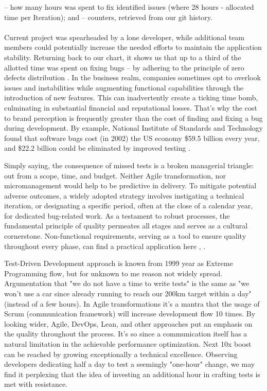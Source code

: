 \noindent {} -- how many hours was spent to fix identified issues (where 28 hours - allocated time per Iteration);
 and  -- counters, retrieved from our git history.\\
\\

Current project was spearheaded by a lone developer, while additional team members could potentially increase 
the needed efforts \cite{Alm21} to maintain the application stability. Returning back to our chart, it shows us 
that up to a third of the allotted time was spent on fixing bugs -- by adhering to the principle of zero 
defects distribution \cite{Allan98}. In the business realm, companies sometimes opt to overlook issues and instabilities 
while augmenting functional capabilities through the introduction of new features. This can inadvertently create a ticking 
time bomb, culminating in substantial financial and reputational losses. That's why the cost to brand perception is 
frequently greater than the cost of finding and fixing a bug during development. By example, National Institute of 
Standards and Technology found that software bugs cost (in 2002) the US economy \$59.5 billion every year, and 
\$22.2 billion could be eliminated by improved testing \cite{RTI02}.

Simply saying, the consequence of missed tests is a broken managerial triangle: out from a scope, time, and budget.
Neither Agile transformation, nor micromanagement would help to be predictive in delivery. To mitigate potential adverse 
outcomes, a widely adopted strategy involves instigating a technical iteration, or designating a specific period, often 
at the close of a calendar year, for dedicated bug-related work. As a testament to robust processes, the fundamental 
principle of quality permeates all stages and serves as a cultural cornerstone. Non-functional requirements, serving 
as a tool to ensure quality throughout every phase, can find a practical application here \cite{Sam17}, \cite{Suz12}. 

Test-Driven Development approach is known from 1999 year as Extreme Programming flow, but for unknown to me reason 
not widely spread. Argumentation that "we do not have a time to write tests" is the same as "we won't use a car since 
already running to reach our 200km target within a day" (instead of a few hours). In Agile transformations it's a mantra 
that the usage of Scrum (communication framework) will increase development flow 10 times. By looking wider, 
Agile, DevOps, Lean, and other approaches put an emphasis on the quality throughout the process. It's so since a 
communication itself has a natural limitation in the achievable performance optimization. Next 10x boost can be reached 
by growing exceptionally a technical excellence. Observing developers dedicating half a day to test a seemingly 
"one-hour" change, we may find it perplexing that the idea of investing an additional hour in crafting tests is met with 
resistance.

